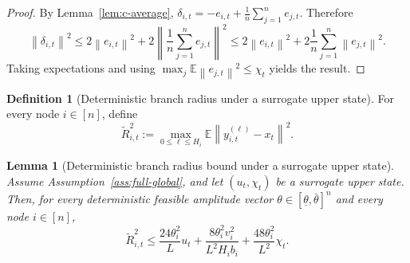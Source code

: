 \documentclass{article}
\newtheorem{lemma}[theorem]{Lemma}
\theoremstyle{definition}
\newtheorem{definition}[theorem]{Definition}
\newcommand{\EE}{\mathbb E}
\newcommand{\norm}[1]{\left\lVert #1\right\rVert}
\begin{document}
\begin{proof}
By Lemma~\ref{lem:c-average}, $
\delta_{i,t}=-e_{i,t}+\frac1n\sum_{j=1}^n e_{j,t}$.
Therefore
\[
\norm{\delta_{i,t}}^2
\le
2\norm{e_{i,t}}^2+2\left\|\frac1n\sum_{j=1}^n e_{j,t}\right\|^2
\le
2\norm{e_{i,t}}^2+2\frac1n\sum_{j=1}^n \norm{e_{j,t}}^2.
\]
Taking expectations and using
$\max_j\EE\norm{e_{j,t}}^2\le \chi_t$ yields the result.
\end{proof}

\begin{definition}[Deterministic branch radius under a surrogate upper state]
\label{def:sur-radius}
For every node $i\in[n]$, define
\[
\widetilde R_{i,t}^2
:=
\max_{0\le \ell\le H_i}
\EE\norm{y_{i,t}^{(\ell)}-x_t}^2.
\]
\end{definition}

\begin{lemma}[Deterministic branch radius bound under a surrogate upper state]
\label{lem:sur-radius}
Assume Assumption~\ref{ass:full-global}, and let $(u_t,\chi_t)$ be a surrogate
upper state. Then, for every deterministic feasible amplitude vector
$\theta\in[\underline\theta,\bar\theta]^n$ and every node $i\in[n]$,
\begin{equation}
\widetilde R_{i,t}^2
\le
\frac{24\theta_i^2}{L}u_t
+
\frac{8\theta_i^2 v_i^2}{L^2 H_i b_i}
+
\frac{48\theta_i^2}{L^2}\chi_t.
\label{eq:sur-radius-app}\end{equation}
\end{lemma}
\end{document}
